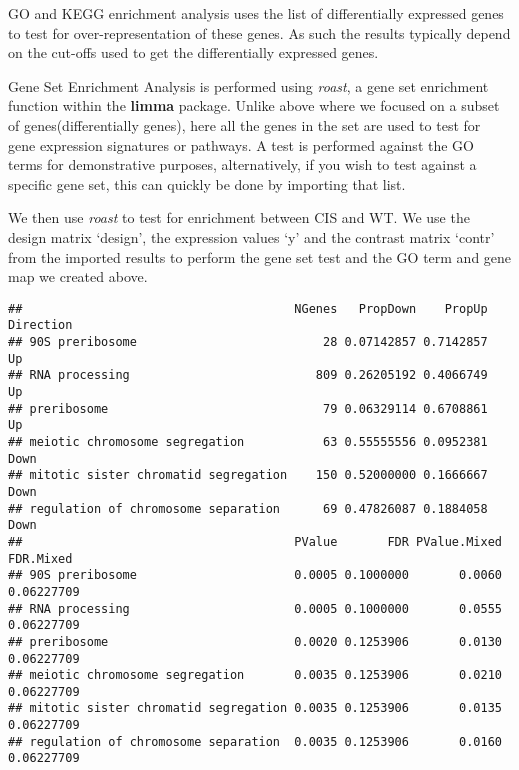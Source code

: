 \documentclass[
  openany]{book}
\newenvironment{Shaded}{\begin{snugshade}}{\end{snugshade}}
\newcommand{\AttributeTok}[1]{\textcolor[rgb]{0.77,0.63,0.00}{#1}}
\newcommand{\FunctionTok}[1]{\textcolor[rgb]{0.00,0.00,0.00}{#1}}
\newcommand{\NormalTok}[1]{#1}
\newcommand{\OtherTok}[1]{\textcolor[rgb]{0.56,0.35,0.01}{#1}}
\newcommand{\SpecialCharTok}[1]{\textcolor[rgb]{0.00,0.00,0.00}{#1}}
\begin{document}
GO and KEGG enrichment analysis uses the list of differentially expressed genes to test for over-representation of these genes. As such the results typically depend on the cut-offs used to get the differentially expressed genes.

Gene Set Enrichment Analysis is performed using \emph{roast}, a gene set enrichment function within the \textbf{limma} package. Unlike above where we focused on a subset of genes(differentially genes), here all the genes in the set are used to test for gene expression signatures or pathways. A test is performed against the GO terms for demonstrative purposes, alternatively, if you wish to test against a specific gene set, this can quickly be done by importing that list.

We then use \emph{roast} to test for enrichment between CIS and WT. We use the design matrix `design', the expression values `y' and the contrast matrix `contr' from the imported results to perform the gene set test and the GO term and gene map we created above.

\begin{Shaded}
\end{Shaded}

\begin{verbatim}
##                                      NGenes   PropDown    PropUp Direction
## 90S preribosome                          28 0.07142857 0.7142857        Up
## RNA processing                          809 0.26205192 0.4066749        Up
## preribosome                              79 0.06329114 0.6708861        Up
## meiotic chromosome segregation           63 0.55555556 0.0952381      Down
## mitotic sister chromatid segregation    150 0.52000000 0.1666667      Down
## regulation of chromosome separation      69 0.47826087 0.1884058      Down
##                                      PValue       FDR PValue.Mixed  FDR.Mixed
## 90S preribosome                      0.0005 0.1000000       0.0060 0.06227709
## RNA processing                       0.0005 0.1000000       0.0555 0.06227709
## preribosome                          0.0020 0.1253906       0.0130 0.06227709
## meiotic chromosome segregation       0.0035 0.1253906       0.0210 0.06227709
## mitotic sister chromatid segregation 0.0035 0.1253906       0.0135 0.06227709
## regulation of chromosome separation  0.0035 0.1253906       0.0160 0.06227709
\end{verbatim}
\end{document}
